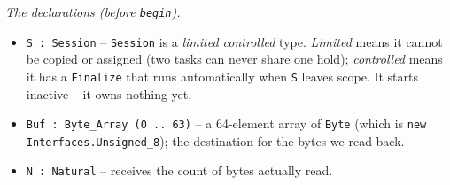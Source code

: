 \emph{The declarations (before \texttt{begin}).}
\begin{itemize}
\item \texttt{S : Session} -- \texttt{Session} is a \emph{limited controlled}
  type. \emph{Limited} means it cannot be copied or assigned (two tasks can
  never share one hold); \emph{controlled} means it has a \texttt{Finalize} that
  runs automatically when \texttt{S} leaves scope. It starts inactive -- it
  owns nothing yet.
\item \texttt{Buf : Byte\_Array (0 .. 63)} -- a 64-element array of
  \texttt{Byte} (which is \texttt{new Interfaces.Unsigned\_8}); the destination
  for the bytes we read back.
\item \texttt{N : Natural} -- receives the count of bytes actually read.
\end{itemize}

